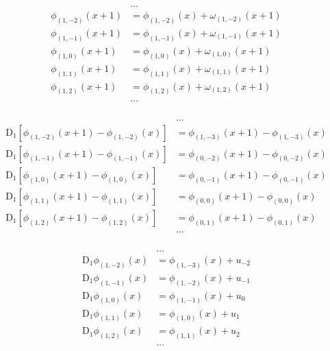\begin{equation*} \begin{aligned}
&\ldots
\\
\phi_{(1,-2)}(x + 1) &= 
  \phi_{(1,-2)}(x) + \omega_{(1,-2)}(x + 1)
\\
\phi_{(1,-1)}(x + 1) &= 
  \phi_{(1,-1)}(x) + \omega_{(1,-1)}(x + 1)  
\\
\phi_{(1,0)}(x + 1) &= 
  \phi_{(1,0)}(x) + \omega_{(1,0)}(x + 1)  
\\
\phi_{(1,1)}(x + 1) &= 
  \phi_{(1,1)}(x) + \omega_{(1,1)}(x + 1)  
\\
\phi_{(1,2)}(x + 1) &= 
  \phi_{(1,2)}(x) + \omega_{(1,2)}(x + 1)  
\\
&\ldots \\
\end{aligned} \end{equation*}

\begin{equation*} \begin{aligned}
&\ldots \\
\mathrm{D}_1 \left[\phi_{(1,-2)}(x + 1) - \phi_{(1,-2)}(x) \right] &= \phi_{(1,-3)}(x + 1) - \phi_{(1,-3)}(x)
\\
\mathrm{D}_1 \left[\phi_{(1,-1)}(x + 1) - \phi_{(1,-1)}(x) \right] &= \phi_{(0,-2)}(x + 1) - \phi_{(0,-2)}(x)  
\\
\mathrm{D}_1 \left[\phi_{(1,0)}(x + 1) - \phi_{(1,0)}(x) \right] &= \phi_{(0,-1)}(x + 1) - \phi_{(0,-1)}(x)  
\\
\mathrm{D}_1 \left[\phi_{(1,1)}(x + 1) - \phi_{(1,1)}(x) \right] &= \phi_{(0,0)}(x + 1) - \phi_{(0,0)}(x)  
\\
\mathrm{D}_1 \left[\phi_{(1,2)}(x + 1) - \phi_{(1,2)}(x) \right] &= \phi_{(0,1)}(x + 1) - \phi_{(0,1)}(x)  
\\
&\ldots \\
\end{aligned} \end{equation*}

\begin{equation*} \begin{aligned}
&\ldots
\\
\mathrm{D}_1 \phi_{(1,-2)}(x) &= \phi_{(1,-3)}(x) + u_{-2}  
\\
\mathrm{D}_1 \phi_{(1,-1)}(x) &= \phi_{(1,-2)}(x) + u_{-1}  
\\
\mathrm{D}_1 \phi_{(1,0)}(x) &= \phi_{(1,-1)}(x) + u_0  
\\
\mathrm{D}_1 \phi_{(1,1)}(x) &= \phi_{(1,0)}(x) + u_1 
\\
\mathrm{D}_1 \phi_{(1,2)}(x) &= \phi_{(1,1)}(x) + u_2 
\\
&\ldots
\\
\end{aligned} \end{equation*}
